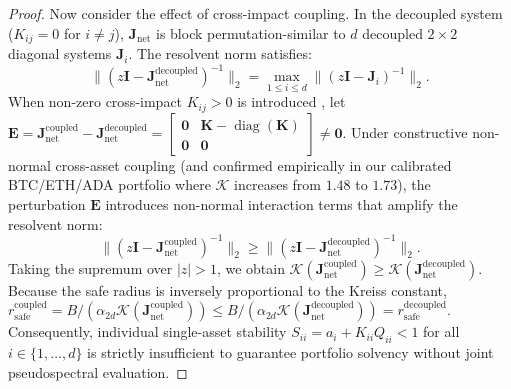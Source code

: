 \documentclass[11pt,a4paper]{article}
\theoremstyle{definition}\newtheorem{definition}[theorem]{Definition}
\theoremstyle{remark}\newtheorem{remark}[theorem]{Remark}
\begin{document}
\begin{proof}
Now consider the effect of cross-impact coupling. In the decoupled system ($K_{ij} = 0$ for $i \ne j$), $\mathbf{J}_{\text{net}}$ is block permutation-similar to $d$ decoupled $2 \times 2$ diagonal systems $\mathbf{J}_i$. The resolvent norm satisfies:
\begin{equation}
\|(z\mathbf{I} - \mathbf{J}_{\text{net}}^{\text{decoupled}})^{-1}\|_2 = \max_{1 \le i \le d} \|(z\mathbf{I} - \mathbf{J}_i)^{-1}\|_2.
\end{equation}
When non-zero cross-impact $K_{ij} > 0$ is introduced \cite{hasbrouck1991,cont2014}, let $\mathbf{E} = \mathbf{J}_{\text{net}}^{\text{coupled}} - \mathbf{J}_{\text{net}}^{\text{decoupled}} = \begin{bmatrix} \mathbf{0} & \mathbf{K} - \operatorname{diag}(\mathbf{K}) \\ \mathbf{0} & \mathbf{0} \end{bmatrix} \ne \mathbf{0}$.
Under constructive non-normal cross-asset coupling (and confirmed empirically in our calibrated BTC/ETH/ADA portfolio where $\mathcal{K}$ increases from $1.48$ to $1.73$), the perturbation $\mathbf{E}$ introduces non-normal interaction terms that amplify the resolvent norm:
\begin{equation}
\|(z\mathbf{I} - \mathbf{J}_{\text{net}}^{\text{coupled}})^{-1}\|_2 \ge \|(z\mathbf{I} - \mathbf{J}_{\text{net}}^{\text{decoupled}})^{-1}\|_2.
\end{equation}
Taking the supremum over $|z| > 1$, we obtain $\mathcal{K}(\mathbf{J}_{\text{net}}^{\text{coupled}}) \ge \mathcal{K}(\mathbf{J}_{\text{net}}^{\text{decoupled}})$.
Because the safe radius is inversely proportional to the Kreiss constant, $r_{\text{safe}}^{\text{coupled}} = B / (\alpha_{2d} \mathcal{K}(\mathbf{J}_{\text{net}}^{\text{coupled}})) \le B / (\alpha_{2d} \mathcal{K}(\mathbf{J}_{\text{net}}^{\text{decoupled}})) = r_{\text{safe}}^{\text{decoupled}}$.
Consequently, individual single-asset stability $S_{ii} = a_i + K_{ii} Q_{ii} < 1$ for all $i \in \{1, \dots, d\}$ is strictly insufficient to guarantee portfolio solvency without joint pseudospectral evaluation.
\end{proof}
\end{document}
